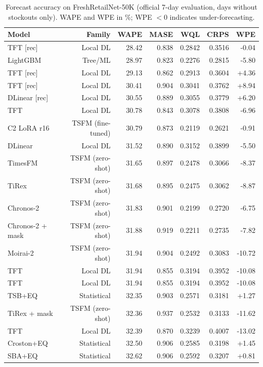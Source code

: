 \begin{table}[t]
\centering
\small
\caption{Forecast accuracy on FreshRetailNet-50K (official 7-day evaluation, days without stockouts only). WAPE and WPE in \%; WPE $<0$ indicates under-forecasting.}
\label{tab:table4_accuracy_frn50k}
\begin{tabular}{lrrrrrr}
\toprule
Model & Family & WAPE & MASE & WQL & CRPS & WPE \\
\midrule
TFT [rec] & Local DL & 28.42 & 0.838 & 0.2842 & 0.3516 & -0.04 \\
LightGBM & Tree/ML & 28.97 & 0.823 & 0.2276 & 0.2815 & -5.80 \\
TFT [rec] & Local DL & 29.13 & 0.862 & 0.2913 & 0.3604 & +4.36 \\
TFT [rec] & Local DL & 30.41 & 0.904 & 0.3041 & 0.3762 & +8.94 \\
DLinear [rec] & Local DL & 30.55 & 0.889 & 0.3055 & 0.3779 & +6.20 \\
TFT & Local DL & 30.78 & 0.843 & 0.3078 & 0.3808 & -6.96 \\
C2 LoRA r16 & TSFM (fine-tuned) & 30.79 & 0.873 & 0.2119 & 0.2621 & -0.91 \\
DLinear & Local DL & 31.52 & 0.890 & 0.3152 & 0.3899 & -5.50 \\
TimesFM & TSFM (zero-shot) & 31.65 & 0.897 & 0.2478 & 0.3066 & -8.37 \\
TiRex & TSFM (zero-shot) & 31.68 & 0.895 & 0.2475 & 0.3062 & -8.87 \\
Chronos-2 & TSFM (zero-shot) & 31.83 & 0.901 & 0.2199 & 0.2720 & -6.75 \\
Chronos-2 + mask & TSFM (zero-shot) & 31.88 & 0.919 & 0.2211 & 0.2735 & -7.82 \\
Moirai-2 & TSFM (zero-shot) & 31.94 & 0.904 & 0.2492 & 0.3083 & -10.72 \\
TFT & Local DL & 31.94 & 0.855 & 0.3194 & 0.3952 & -10.08 \\
TFT & Local DL & 31.94 & 0.855 & 0.3194 & 0.3952 & -10.08 \\
TSB+EQ & Statistical & 32.35 & 0.903 & 0.2571 & 0.3181 & +1.27 \\
TiRex + mask & TSFM (zero-shot) & 32.36 & 0.937 & 0.2532 & 0.3133 & -11.62 \\
TFT & Local DL & 32.39 & 0.870 & 0.3239 & 0.4007 & -13.02 \\
Croston+EQ & Statistical & 32.50 & 0.906 & 0.2585 & 0.3198 & +1.45 \\
SBA+EQ & Statistical & 32.62 & 0.906 & 0.2592 & 0.3207 & +0.81 \\

\end{tabular}
\end{table}
